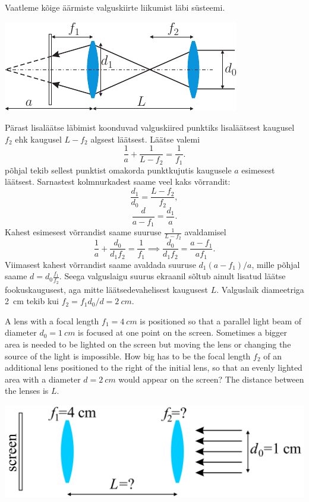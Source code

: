 \solu
Vaatleme kõige äärmiste valguskiirte liikumist läbi süsteemi. 
\begin{center}
\includegraphics[scale=1.5]{2015-v3g-02-valgustamine-lah}
\end{center}
Pärast lisaläätse läbimist koonduvad valguskiired punktiks lisaläätsest kaugusel $f_2$ ehk kaugusel $L-f_2$ algsest läätsest. Läätse valemi 
\begin{equation}
\frac{1}{a}+\frac{1}{L-f_2}=\frac{1}{f_1}.
\end{equation}
põhjal tekib sellest punktist omakorda punktkujutis kaugusele $a$ esimesest läätsest. Sarnastest kolmnurkadest saame veel kaks võrrandit:
\begin{equation}
\frac{d_1}{d_0}=\frac{L-f_2}{f_2},
\end{equation}
\begin{equation}
\frac{d}{a-f_1}=\frac{d_1}{a}.
\end{equation}
Kahest esimesest võrrandist saame suuruse $\frac{1}{L-f_2}$ avaldamisel
\begin{equation}
\frac{1}{a}+\frac{d_0}{d_1f_2}=\frac{1}{f_1}\implies \frac{d_0}{d_1f_2}=\frac{a-f_1}{af_1}.
\end{equation}
Viimasest kahest võrrandist saame avaldada suuruse $d_1(a-f_1)/a$, mille põhjal saame $d=d_0\frac{f_1}{f_2}.$ Seega valguslaigu suurus ekraanil sõltub ainult lisatud läätse fookuskaugusest, aga mitte läätsedevahelisest kaugusest $L$. Valguslaik diameetriga \SI{2}{cm} tekib kui $f_2=f_1d_0/d=\SI{2}{cm}$.

A lens with a focal length $f_1=\SI{4}{cm}$ is positioned so that a parallel light beam of diameter $d_0=\SI{1}{cm}$ is focused at one point on the screen. Sometimes a bigger area is needed to be lighted on the screen but moving the lens or changing the source of the light is impossible. How big has to be the focal length $f_2$ of an additional lens positioned to the right of the initial lens, so that an evenly lighted area with a diameter $d=\SI{2}{cm}$ would appear on the screen? The distance between the lenses is $L$.
\begin{center}
\includegraphics[scale=1.5]{2015-v3g-02-valgustamine-yles_ing}
\end{center}

